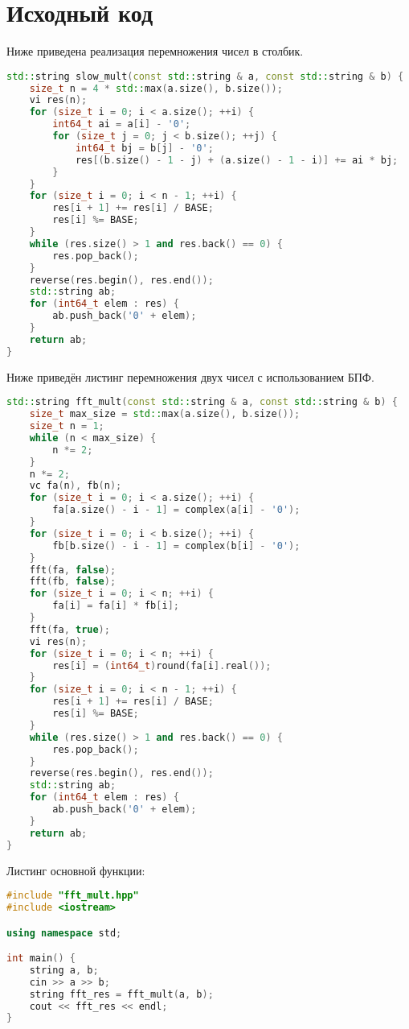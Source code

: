 \section{Исходный код}

Ниже приведена реализация перемножения чисел в столбик.

\begin{lstlisting}[language=C++]
std::string slow_mult(const std::string & a, const std::string & b) {
    size_t n = 4 * std::max(a.size(), b.size());
    vi res(n);
    for (size_t i = 0; i < a.size(); ++i) {
        int64_t ai = a[i] - '0';
        for (size_t j = 0; j < b.size(); ++j) {
            int64_t bj = b[j] - '0';
            res[(b.size() - 1 - j) + (a.size() - 1 - i)] += ai * bj;
        }
    }
    for (size_t i = 0; i < n - 1; ++i) {
        res[i + 1] += res[i] / BASE;
        res[i] %= BASE;
    }
    while (res.size() > 1 and res.back() == 0) {
        res.pop_back();
    }
    reverse(res.begin(), res.end());
    std::string ab;
    for (int64_t elem : res) {
        ab.push_back('0' + elem);
    }
    return ab;
}
\end{lstlisting}

Ниже приведён листинг перемножения двух чисел с использованием БПФ.

\begin{lstlisting}[language=C++]
std::string fft_mult(const std::string & a, const std::string & b) {
    size_t max_size = std::max(a.size(), b.size());
    size_t n = 1;
    while (n < max_size) {
        n *= 2;
    }
    n *= 2;
    vc fa(n), fb(n);
    for (size_t i = 0; i < a.size(); ++i) {
        fa[a.size() - i - 1] = complex(a[i] - '0');
    }
    for (size_t i = 0; i < b.size(); ++i) {
        fb[b.size() - i - 1] = complex(b[i] - '0');
    }
    fft(fa, false);
    fft(fb, false);
    for (size_t i = 0; i < n; ++i) {
        fa[i] = fa[i] * fb[i];
    }
    fft(fa, true);
    vi res(n);
    for (size_t i = 0; i < n; ++i) {
        res[i] = (int64_t)round(fa[i].real());
    }
    for (size_t i = 0; i < n - 1; ++i) {
        res[i + 1] += res[i] / BASE;
        res[i] %= BASE;
    }
    while (res.size() > 1 and res.back() == 0) {
        res.pop_back();
    }
    reverse(res.begin(), res.end());
    std::string ab;
    for (int64_t elem : res) {
        ab.push_back('0' + elem);
    }
    return ab;
}
\end{lstlisting}

Листинг основной функции:
\begin{lstlisting}[language=C++]
#include "fft_mult.hpp"
#include <iostream>

using namespace std;

int main() {
    string a, b;
    cin >> a >> b;
    string fft_res = fft_mult(a, b);
    cout << fft_res << endl;
}
\end{lstlisting}

\pagebreak
